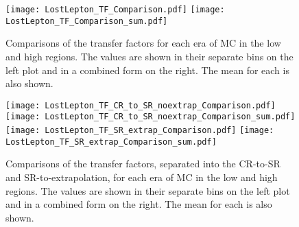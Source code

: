 \begin{figure}[!htb]
	\begin{center}
  \texttt{[image: LostLepton\_TF\_Comparison.pdf]}
  \texttt{[image: LostLepton\_TF\_Comparison\_sum.pdf]} \\
	\end{center}
	\caption[Transfer Factor Comparison]{Comparisons of the transfer factors for each era of MC in the low and high \dm{} regions. The values are shown in their separate bins on the left plot and in a combined form on the right. The mean for each is also shown. 
	 }
	\label{fig:llb-1lcr-datavsmc-total-tf}
\end{figure}
\begin{figure}[!htb]
	\begin{center}  
		\texttt{[image: LostLepton\_TF\_CR\_to\_SR\_noextrap\_Comparison.pdf]}
		\texttt{[image: LostLepton\_TF\_CR\_to\_SR\_noextrap\_Comparison\_sum.pdf]} \\
		\texttt{[image: LostLepton\_TF\_SR\_extrap\_Comparison.pdf]}
		\texttt{[image: LostLepton\_TF\_SR\_extrap\_Comparison\_sum.pdf]}
	\end{center}
	\caption[Separated Transfer Factor Comparison]{Comparisons of the transfer factors, separated into the CR-to-SR and SR-to-extrapolation, for each era of MC in the low and high \dm{} regions. The values are shown in their separate bins on the left plot and in a combined form on the right. The mean for each is also shown. 
	 }
	\label{fig:llb-1lcr-datavsmc-sep-tf}
\end{figure}
